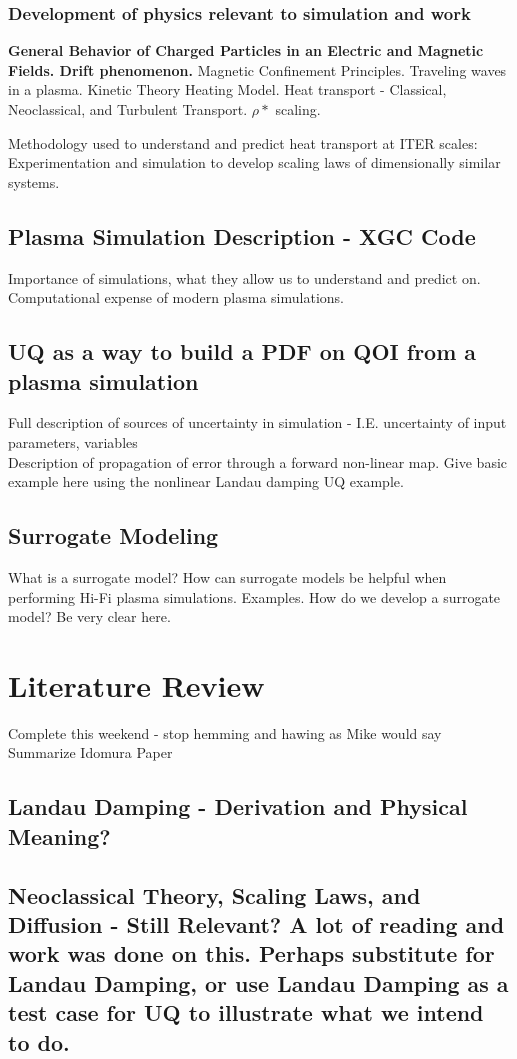 \documentclass{article}
\begin{document}
\subsubsection{Development of physics relevant to simulation and work}
\textbf{General Behavior of Charged Particles in an Electric and Magnetic Fields.
Drift phenomenon.}
Magnetic Confinement Principles.
Traveling waves in a plasma.
Kinetic Theory
Heating Model.
Heat transport - Classical, Neoclassical, and Turbulent Transport.
$\rho*$ scaling.

Methodology used to understand and predict heat transport at ITER scales:
Experimentation and simulation to develop scaling laws of dimensionally similar systems.
\subsection{Plasma Simulation Description - XGC Code}
Importance of simulations, what they allow us to understand and predict on. \\
Computational expense of modern plasma simulations.
\subsection{UQ as a way to build a PDF on QOI from a plasma simulation}
Full description of sources of uncertainty in simulation - I.E. uncertainty of input parameters, variables\\
Description of propagation of error through a forward non-linear map. Give basic example here using the nonlinear Landau damping UQ example.\\
\subsection{Surrogate Modeling}
What is a surrogate model? How can surrogate models be helpful when performing  Hi-Fi plasma simulations. Examples. 
How do we develop a surrogate model? Be very clear here.
\section{Literature Review}
Complete this weekend - stop hemming and hawing as Mike would say
Summarize Idomura Paper 
\subsection{Landau Damping - Derivation and Physical Meaning?}
\subsection{Neoclassical Theory, Scaling Laws, and Diffusion - Still Relevant? A lot of reading and work was done on this. Perhaps substitute for Landau Damping, or use Landau Damping as a test case for UQ to illustrate what we intend to do.}
\end{document}
